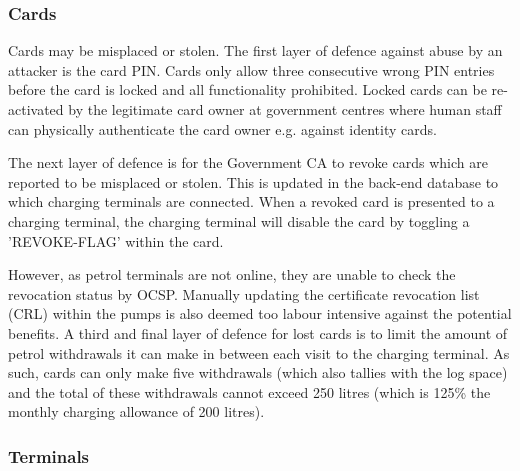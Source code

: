 \subsubsection{Cards}
Cards may be misplaced or stolen. The first layer of defence against abuse by an attacker is the card PIN. Cards only allow three consecutive wrong PIN entries before the card is locked and all functionality prohibited. Locked cards can be re-activated by the legitimate card owner at government centres where human staff can physically authenticate the card owner e.g. against identity cards.

The next layer of defence is for the Government CA to revoke cards which are reported to be misplaced or stolen. This is updated in the back-end database to which charging terminals are connected. When a revoked card is presented to a charging terminal, the charging terminal will disable the card by toggling a 'REVOKE-FLAG' within the card.

However, as petrol terminals are not online, they are unable to check the revocation status by OCSP. Manually updating the certificate revocation list (CRL) within the pumps is also deemed too labour intensive against the potential benefits. A third and final layer of defence for lost cards is to limit the amount of petrol withdrawals it can make in between each visit to the charging terminal. As such, cards can only make five withdrawals (which also tallies with the log space) and the total of these withdrawals cannot exceed 250 litres (which is 125\% the monthly charging allowance of 200 litres).

\subsubsection{Terminals}
